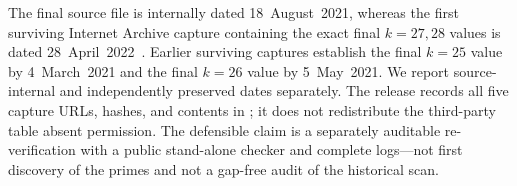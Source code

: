 The final source file is internally dated 18~August~2021, whereas the first
surviving Internet Archive capture containing the exact final $k=27,28$ values
is dated 28~April~2022~\cite{MonroePhase2Archive}. Earlier surviving captures
establish the final $k=25$ value by 4~March~2021 and the final $k=26$ value by
5~May~2021. We report source-internal and independently preserved dates
separately. The release records all five capture URLs, hashes, and contents in
; it does not redistribute the
third-party table absent permission. The defensible claim is a separately
auditable re-verification with a public stand-alone checker and complete
logs---not first discovery of the primes and not a gap-free audit of the
historical scan.
